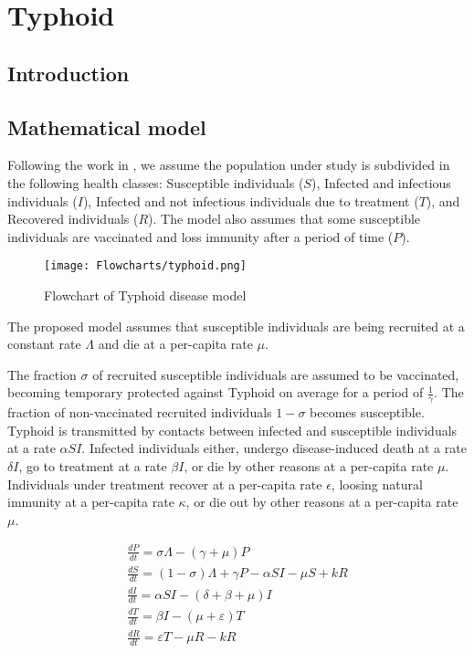 \documentclass{book}\usepackage[]{graphicx}\usepackage[]{color}
\begin{document}
\section{Typhoid}
\subsection*{Introduction}
\subsection*{Mathematical model}
Following the work in \cite{peter2017mathematical}, we assume the population under study is subdivided in the following health classes: Susceptible individuals ($S$), Infected and infectious individuals ($I$), Infected and not infectious individuals due to treatment ($T$), and Recovered individuals ($R$). The model also assumes that some susceptible individuals are vaccinated and loss immunity after a period of time ($P$).

\begin{figure}[H]
    \centering
    \texttt{[image: Flowcharts/typhoid.png]}
    \caption{Flowchart of Typhoid disease model}
    \label{fig:typhoid_flow}
\end{figure}

The proposed model assumes that susceptible individuals are being recruited at a constant rate $\Lambda$ and die at a per-capita rate $\mu$.

The fraction $\sigma$ of recruited susceptible individuals are assumed to be vaccinated, becoming temporary protected against Typhoid on average for a period of $\frac{1}{\gamma}$. The fraction of non-vaccinated recruited individuals $1-\sigma$ becomes susceptible. Typhoid is transmitted by contacts between infected and susceptible individuals at a rate $\alpha S I$. 
%
Infected individuals either, undergo disease-induced death at a rate $\delta I$, go to treatment at a rate $\beta I$, or die by other reasons at a per-capita rate $\mu$.
%
Individuals under treatment recover at a per-capita rate $\epsilon$, loosing natural immunity at a per-capita rate $\kappa$, or die out by other reasons at a per-capita rate $\mu$.
%

\begin{equation}
\begin{array}{l}
\frac{d P}{d t}=\sigma \Lambda-(\gamma+\mu) P \\
\frac{d S}{d t}=(1-\sigma) \Lambda+\gamma P-\alpha S I-\mu S+k R \\
\frac{d I}{d t}=\alpha S I-(\delta+\beta+\mu) I \\
\frac{d T}{d t}=\beta I-(\mu+\varepsilon) T \\
\frac{d R}{d t}=\varepsilon T-\mu R-k R
\end{array}
\end{equation}
\end{document}
